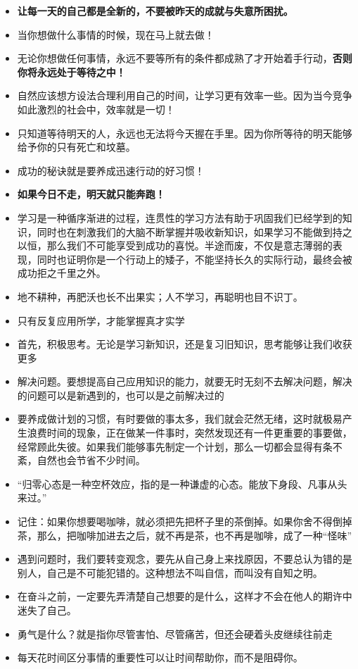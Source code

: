 \documentclass[UTF8,a4paper,8pt]{ctexbook}
\begin{document}
\begin{itemize}
			\item \textbf{让每一天的自己都是全新的，不要被昨天的成就与失意所困扰。}
			\item 当你想做什么事情的时候，现在马上就去做！
			\item 无论你想做任何事情，永远不要等所有的条件都成熟了才开始着手行动，\textbf{否则你将永远处于等待之中！}
			\item 自然应该想方设法合理利用自己的时间，让学习更有效率一些。因为当今竞争如此激烈的社会中，效率就是一切！
			\item 只知道等待明天的人，永远也无法将今天握在手里。因为你所等待的明天能够给予你的只有死亡和坟墓。
			\item 成功的秘诀就是要养成迅速行动的好习惯！
			\item \textbf{如果今日不走，明天就只能奔跑！}
			\item 学习是一种循序渐进的过程，连贯性的学习方法有助于巩固我们已经学到的知识，同时也在刺激我们的大脑不断掌握并吸收新知识，如果学习不能做到持之以恒，那么我们不可能享受到成功的喜悦。半途而废，不仅是意志薄弱的表现，同时也证明你是一个行动上的矮子，不能坚持长久的实际行动，最终会被成功拒之千里之外。
			\item 地不耕种，再肥沃也长不出果实；人不学习，再聪明也目不识丁。
			\item 只有反复应用所学，才能掌握真才实学
			\item 首先，积极思考。无论是学习新知识，还是复习旧知识，思考能够让我们收获更多
			\item 解决问题。要想提高自己应用知识的能力，就要无时无刻不去解决问题，解决的问题可以是新遇到的，也可以是之前解决过的
			\item 要养成做计划的习惯，有时要做的事太多，我们就会茫然无绪，这时就极易产生浪费时间的现象，正在做某一件事时，突然发现还有一件更重要的事要做，经常顾此失彼。如果我们能够事先制定一个计划，那么一切都会显得有条不紊，自然也会节省不少时间。
			\item “归零心态是一种空杯效应，指的是一种谦虚的心态。能放下身段、凡事从头来过。”
			\item 记住：如果你想要喝咖啡，就必须把先把杯子里的茶倒掉。如果你舍不得倒掉茶，那么，把咖啡加进去之后，就不再是茶，也不再是咖啡，成了一种“怪味”
			\item 遇到问题时，我们要转变观念，要先从自己身上来找原因，不要总认为错的是别人，自己是不可能犯错的。这种想法不叫自信，而叫没有自知之明。
			\item 
			在奋斗之前，一定要先弄清楚自己想要的是什么，这样才不会在他人的期许中迷失了自己。
			\item 勇气是什么？就是指你尽管害怕、尽管痛苦，但还会硬着头皮继续往前走
			\item 每天花时间区分事情的重要性可以让时间帮助你，而不是阻碍你。
		\end{itemize}
	
\end{document}
